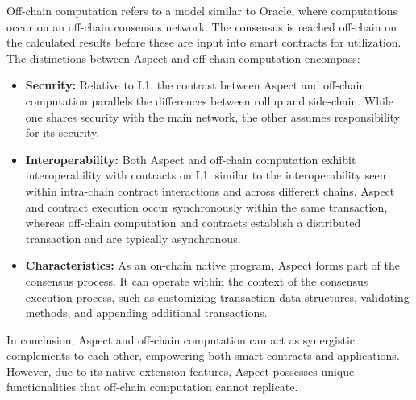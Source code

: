 Off-chain computation refers to a model similar to Oracle, where computations occur on an off-chain consensus network. The consensus is reached off-chain on the calculated results before these are input into smart contracts for utilization.
The distinctions between Aspect and off-chain computation encompass:

\begin{itemize}
  \item \textbf{Security:} Relative to L1, the contrast between Aspect and off-chain computation parallels the differences between rollup and side-chain. While one shares security with the main network, the other assumes responsibility for its security.
  \item \textbf{Interoperability:} Both Aspect and off-chain computation exhibit interoperability with contracts on L1, similar to the interoperability seen within intra-chain contract interactions and across different chains. Aspect and contract execution occur synchronously within the same transaction, whereas off-chain computation and contracts establish a distributed transaction and are typically asynchronous.
  \item \textbf{Characteristics:} As an on-chain native program, Aspect forms part of the consensus process. It can operate within the context of the consensus execution process, such as customizing transaction data structures, validating methods, and appending additional transactions.
\end{itemize}

In conclusion, Aspect and off-chain computation can act as synergistic complements to each other, empowering both smart contracts and applications. However, due to its native extension features, Aspect possesses unique functionalities that off-chain computation cannot replicate.

